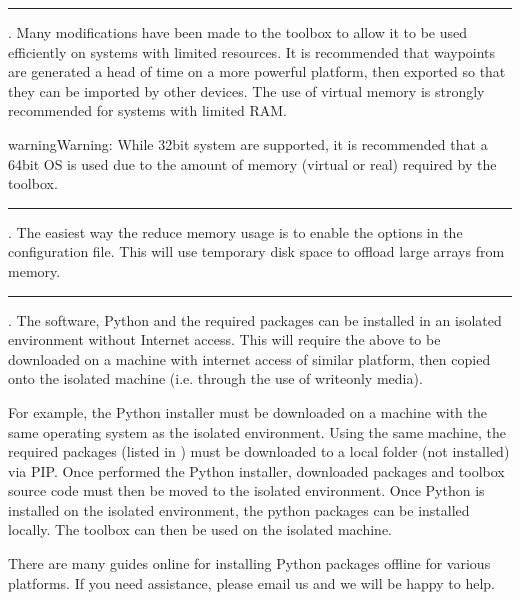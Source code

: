 \documentclass[letterpaper,10pt,english]{sphinxmanual}
\begin{document}
\bigskip\hrule\bigskip

\begin{description}
\sphinxAtStartPar
{}. Many modifications have been made to the toolbox to allow it to be used efficiently on systems with limited
resources. It is recommended that waypoints are generated a head of time on a more powerful platform, then exported
so that they can be imported by other devices. The use of virtual memory is strongly recommended for systems with
limited RAM.

\begin{sphinxadmonition}{warning}{Warning:}
\sphinxAtStartPar
While 32\sphinxhyphen{}bit system are supported, it is recommended that a 64\sphinxhyphen{}bit OS is used due to the amount of memory
(virtual or real) required by the toolbox.
\end{sphinxadmonition}

\end{description}


\bigskip\hrule\bigskip

\begin{description}
\sphinxAtStartPar
{}. The easiest way the reduce memory usage is to enable the  options in the configuration
file. This will use temporary disk space to offload large arrays from memory.

\end{description}


\bigskip\hrule\bigskip

\begin{description}
\sphinxAtStartPar
{}. The software, Python and the required packages can be installed in an isolated environment without
Internet access. This will require the above to be downloaded on a machine with internet access of similar
platform, then copied onto the isolated machine (i.e. through the use of write\sphinxhyphen{}only media).

\sphinxAtStartPar
For example, the Python installer must be downloaded on a machine with the same operating system as the isolated
environment. Using the same machine, the required packages (listed in ) must be downloaded to a
local folder (not installed) via PIP. Once performed the Python installer, downloaded packages and toolbox source
code must then be moved to the isolated environment. Once Python is installed on the isolated environment, the
python packages can be installed locally. The toolbox can then be used on the isolated machine.

\sphinxAtStartPar
There are many guides online for installing Python packages offline for various platforms. If you need assistance,
please email us and we will be happy to help.

\end{description}
\end{document}
